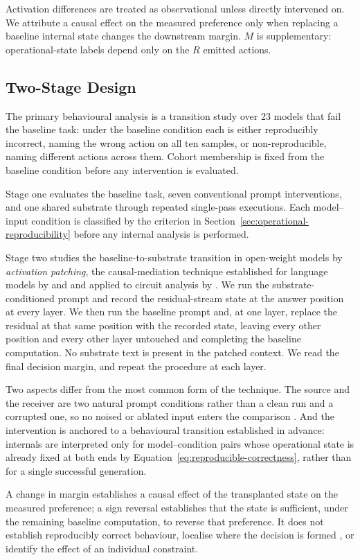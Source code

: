 Activation differences are treated as observational unless directly
intervened on. We attribute a causal effect on the measured preference
only when replacing a baseline internal state changes the downstream
margin. $M$ is supplementary: operational-state labels depend only on
the $R$ emitted actions.


\subsection{Two-Stage Design}
\label{sec:two-stage-design}

The primary behavioural analysis is a transition study over 23 models
that fail the baseline task: under the baseline condition each is
either reproducibly incorrect, naming the wrong action on all ten
samples, or non-reproducible, naming different actions across them.
Cohort membership is fixed from the baseline condition before any
intervention is evaluated.

Stage one evaluates the baseline task, seven conventional prompt
interventions, and one shared substrate through repeated single-pass
executions. Each model--input condition is classified by the criterion
in Section~\ref{sec:operational-reproducibility} before any internal
analysis is performed.

Stage two studies the baseline-to-substrate transition in open-weight
models by \emph{activation patching}, the causal-mediation technique
established for language models by \citet{vig2020causal} and
\citet{meng2022locating} and applied to circuit analysis by
\citet{wang2023interpretability}. We run the substrate-conditioned
prompt and record the residual-stream state at the answer position at
every layer. We then run the baseline prompt and, at one layer, replace
the residual at that same position with the recorded state, leaving
every other position and every other layer untouched and completing the
baseline computation. No substrate text is present in the patched
context. We read the final decision margin, and repeat the procedure at
each layer.

Two aspects differ from the most common form of the technique. The
source and the receiver are two natural prompt conditions rather than a
clean run and a corrupted one, so no noised or ablated input enters the
comparison \citep{zhang2024towards}. And the intervention is anchored to
a behavioural transition established in advance: internals are
interpreted only for model--condition pairs whose operational state is
already fixed at both ends by
Equation~\eqref{eq:reproducible-correctness}, rather than for a single
successful generation.

A change in margin establishes a causal effect of the transplanted
state on the measured preference; a sign reversal establishes that the
state is sufficient, under the remaining baseline computation, to
reverse that preference. It does not establish reproducibly correct
behaviour, localise where the decision is formed
\citep{zhang2024towards}, or identify the effect of an individual
constraint.
